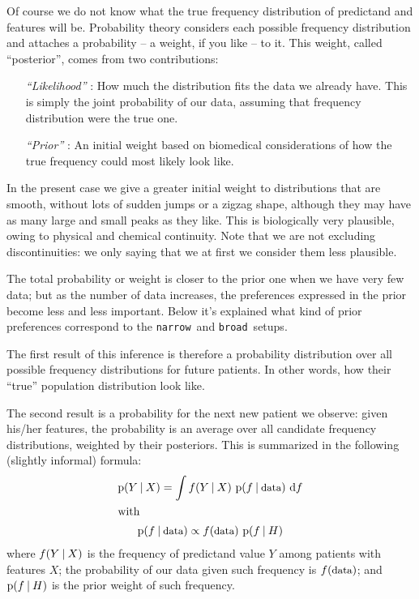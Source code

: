 \documentclass[\ifafour a4paper,12pt,\else a5paper,10pt,\fi%
onecolumn,oneside,article,%
british%
]{memoir}
\theoremstyle{remark}
\theoremstyle{innote}
\newcommand*{\di}{\mathrm{d}}%
\newcommand*{\p}{\mathrm{p}}%
\renewcommand*{\|}[1][]{\nonscript\:#1\vert\nonscript\:\mathopen{}}
\newcommand*{\narrow}{\texttt{narrow}}
\newcommand*{\broad}{\texttt{broad}}
\begin{document}
Of course we do not know what the true frequency distribution of predictand
and features will be. Probability theory considers each possible frequency
distribution and attaches a probability -- a weight, if you like -- to it.
This weight, called \enquote{posterior}, comes from two contributions:
\begin{itemize}[wide]
\item[\emph{\enquote{Likelihood}}]\!: How much the distribution fits the data
  we already have. This is simply the joint probability of our data,
  assuming that frequency distribution were the true one.
\item[\emph{\enquote{Prior}}]\!: An initial weight based on biomedical
  considerations of how the true frequency could most likely look like.
\end{itemize}
In the present case we give a greater initial weight to distributions that
are smooth, without lots of sudden jumps or a zigzag shape, although they
may have as many large and small peaks as they like. This is biologically
very plausible, owing to physical and chemical continuity. Note that we are
not excluding discontinuities: we only saying that we at first we consider
them less plausible.

The total probability or weight is closer to the prior one when we have
very few data; but as the number of data increases, the preferences
expressed in the prior become less and less important. Below it's explained
what kind of prior preferences correspond to the \narrow\ and \broad\
setups.

The first result of this inference is therefore a probability distribution
over all possible frequency distributions for future patients. In other
words, how their \enquote{true} population distribution look like.

The second result is a probability for the next new patient we observe:
given his/her features, the probability is an average over all candidate
frequency distributions, weighted by their posteriors. This is summarized
in the following (slightly informal) formula:
\begin{subequations}  \label{eq:definetti}
  \begin{gather}
    \p(Y \|X) =    \int f(Y \| X) \ \p(f \| \textrm{\small data})\ \di f
    \\
    \shortintertext{with}
    \p(f \| \textrm{\small data}) \propto
    f(\textrm{\small data})\ \p(f \| H)
  \end{gather}
\end{subequations}
where $f(Y\|X)$ is the frequency of predictand value $Y$ among patients
with features $X$; the probability of our data given such frequency is
$f(\textrm{\small data})$; and $\p(f \| H)$ is the prior weight of such
frequency.
\end{document}
